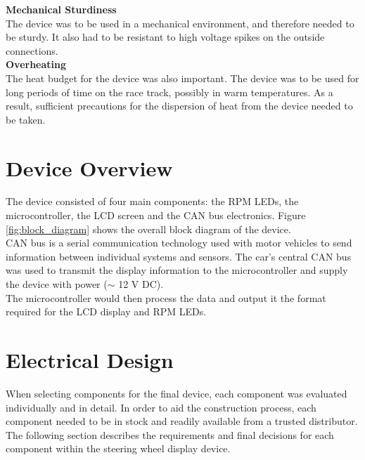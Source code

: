 \documentclass[a4paper,12pt]{article}
\begin{document}
\textbf{Mechanical Sturdiness} \\

The device was to be used in a mechanical environment, and therefore needed to be sturdy. It also had to be resistant to high voltage spikes on the outside connections. \\

\textbf{Overheating} \\

The heat budget for the device was also important. The device was to be used for long periods of time on the race track, possibly in warm temperatures. As a result, sufficient precautions for the dispersion of heat from the device needed to be taken.


\newpage
\section{Device Overview}
\label{sec:device_overview}

The device consisted of four main components: the RPM LEDs, the microcontroller, the LCD screen and the CAN bus electronics. Figure \ref{fig:block_diagram} shows the overall block diagram of the device. \\



CAN bus is a serial communication technology used with motor vehicles to send information between individual systems and sensors. The car's central CAN bus was used to transmit the display information to the microcontroller and supply the device with power ($\sim$ 12 V DC). \\

The microcontroller would then process the data and output it the format required for the LCD display and RPM LEDs. \\


\newpage
\section{Electrical Design}
\label{sec:electrical_design}

When selecting components for the final device, each component was evaluated individually and in detail. In order to aid the construction process, each component needed to be in stock and readily available from a trusted distributor. The following section describes the requirements and final decisions for each component within the steering wheel display device. \\
\end{document}

